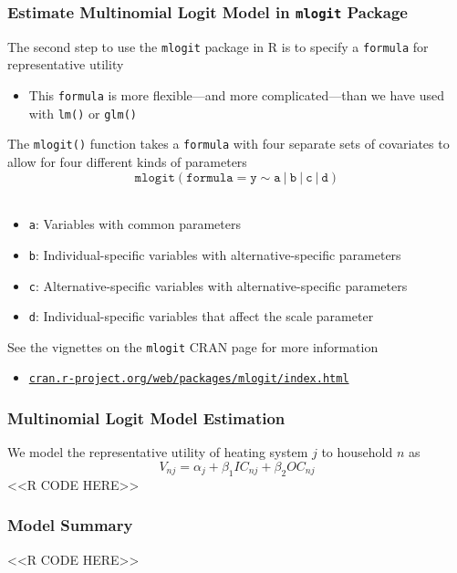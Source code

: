 \documentclass{beamer}
\begin{document}
\begin{frame}\frametitle{Estimate Multinomial Logit Model in \texttt{mlogit} Package}
    The second step to use the \texttt{mlogit} package in R is to specify a \texttt{formula} for representative utility
    \begin{itemize}
    	\item This \texttt{formula} is more flexible---and more complicated---than we have used with \texttt{lm()} or \texttt{glm()}
    \end{itemize}
    \vspace{1ex}
    The \texttt{mlogit()} function takes a \texttt{formula} with four separate sets of covariates to allow for four different kinds of parameters
    $$\mathtt{mlogit(formula = y \sim a ~|~ b ~|~ c ~|~ d)}$$ \\
    \begin{itemize}
    	\item \texttt{a}: Variables with common parameters
    	\item \texttt{b}: Individual-specific variables with alternative-specific parameters
    	\item \texttt{c}: Alternative-specific variables with alternative-specific parameters
    	\item \texttt{d}: Individual-specific variables that affect the scale parameter
    \end{itemize}
    \vspace{1ex}
    See the vignettes on the \texttt{mlogit} CRAN page for more information
    \begin{itemize}
    	\item \href{https://cran.r-project.org/web/packages/mlogit/index.html}{\texttt{cran.r-project.org/web/packages/mlogit/index.html}}
    \end{itemize}
\end{frame}

\begin{frame}[fragile]\frametitle{Multinomial Logit Model Estimation}
    We model the representative utility of heating system $j$ to household $n$ as
    $$V_{nj} = \alpha_j + \beta_1 IC_{nj} + \beta_2 OC_{nj}$$
    <<R CODE HERE>>
\end{frame}

\begin{frame}[fragile]\frametitle{Model Summary}
    <<R CODE HERE>>
\end{frame}
\end{document}
